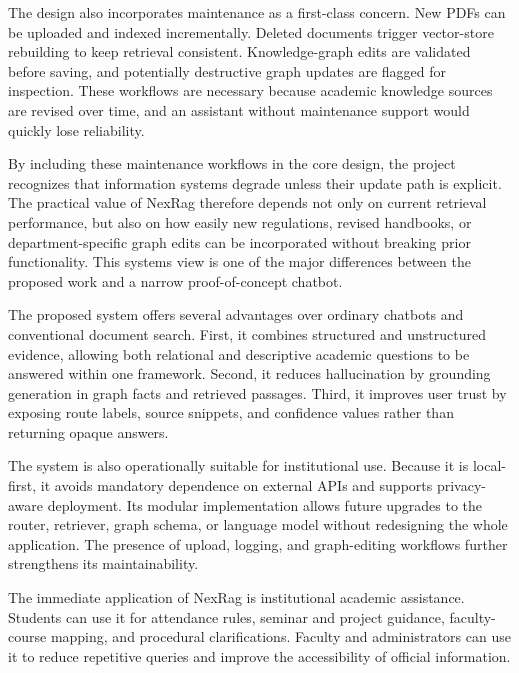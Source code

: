 The design also incorporates maintenance as a first-class concern. New PDFs can be uploaded and indexed incrementally. Deleted documents trigger vector-store rebuilding to keep retrieval consistent. Knowledge-graph edits are validated before saving, and potentially destructive graph updates are flagged for inspection. These workflows are necessary because academic knowledge sources are revised over time, and an assistant without maintenance support would quickly lose reliability.

By including these maintenance workflows in the core design, the project recognizes that information systems degrade unless their update path is explicit. The practical value of NexRag therefore depends not only on current retrieval performance, but also on how easily new regulations, revised handbooks, or department-specific graph edits can be incorporated without breaking prior functionality. This systems view is one of the major differences between the proposed work and a narrow proof-of-concept chatbot.

\label{sec:proposed-advantages}

The proposed system offers several advantages over ordinary chatbots and conventional document search. First, it combines structured and unstructured evidence, allowing both relational and descriptive academic questions to be answered within one framework. Second, it reduces hallucination by grounding generation in graph facts and retrieved passages. Third, it improves user trust by exposing route labels, source snippets, and confidence values rather than returning opaque answers.

The system is also operationally suitable for institutional use. Because it is local-first, it avoids mandatory dependence on external APIs and supports privacy-aware deployment. Its modular implementation allows future upgrades to the router, retriever, graph schema, or language model without redesigning the whole application. The presence of upload, logging, and graph-editing workflows further strengthens its maintainability.

\label{sec:proposed-applications}

The immediate application of NexRag is institutional academic assistance. Students can use it for attendance rules, seminar and project guidance, faculty-course mapping, and procedural clarifications. Faculty and administrators can use it to reduce repetitive queries and improve the accessibility of official information.

